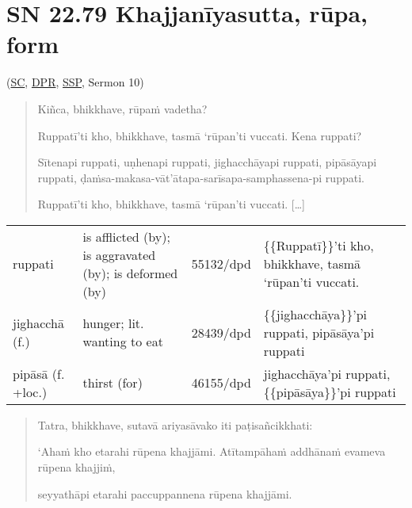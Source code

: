 \documentclass[11pt,oneside]{memoir}
\begin{document}

\clearpage

\section{SN 22.79 Khajjanīyasutta, rūpa, form}
\label{sec:org1d06fb2}
(\href{https://suttacentral.net/sn22.79/pli/ms}{SC}, \href{https://www.digitalpalireader.online/\_dprhtml/index.html?loc=s.2.0.0.0.7.6.m}{DPR}, \href{http://localhost:4848/suttas/sn22.79/pli/ms?quote=Ki\%25C3\%25B1ca\%252C\%2520bhikkhave\%252C\%2520r\%25C5\%25ABpa\%25E1\%25B9\%2581\%2520vadetha\%253F\&window\_type=Sutta+Study}{SSP}, Sermon 10)

\casesLegendHeaderBGHere

\begin{quote}
Kiñca, bhikkhave, rūpaṁ vadetha?

Ruppatī'ti kho, bhikkhave, tasmā ‘rūpan’ti vuccati. Kena ruppati?

Sītenapi ruppati, uṇhenapi ruppati, jighacchāyapi ruppati, pipāsāyapi ruppati,
ḍaṁsa-makasa-vāt'ātapa-sarīsapa-samphassena-pi ruppati.

Ruppatī'ti kho, bhikkhave, tasmā ‘rūpan’ti vuccati. [\ldots{}]
\end{quote}

\begin{longtable}{L{\colOne} L{\colTwo} H H}
ruppati & is afflicted (by); is aggravated (by); is deformed (by) & 55132/dpd & \{\{Ruppatī\}\}'ti kho, bhikkhave, tasmā ‘rūpan’ti vuccati.\\[0pt]
jighacchā (f.) & hunger; lit. wanting to eat & 28439/dpd & \{\{jighacchāya\}\}'pi ruppati, pipāsāya'pi ruppati\\[0pt]
pipāsā (f. +loc.) & thirst (for) & 46155/dpd & jighacchāya'pi ruppati, \{\{pipāsāya\}\}'pi ruppati\\[0pt]
\end{longtable}

\begin{quote}
Tatra, bhikkhave, sutavā ariyasāvako iti paṭisañcikkhati:

‘Ahaṁ kho etarahi rūpena khajjāmi. Atītampāhaṁ addhānaṁ evameva rūpena khajjiṁ,

seyyathāpi etarahi paccuppannena rūpena khajjāmi.
\end{quote}
\end{document}

